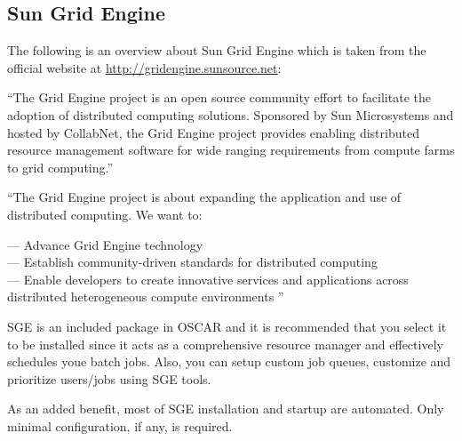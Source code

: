 %
%

\subsection{Sun Grid Engine}
\label{app:sge}

The following is an overview about Sun Grid Engine which is taken from
the official website at \url{http://gridengine.sunsource.net}:

``The Grid Engine project is an open source community effort to facilitate the adoption of distributed computing solutions. Sponsored by Sun Microsystems and hosted by CollabNet, the Grid Engine project provides enabling distributed resource management software for wide ranging requirements from compute farms to grid computing.'' 

``The Grid Engine project is about expanding the application and use of distributed computing. We want to:  

--- Advance Grid Engine technology  \\
--- Establish community-driven standards for distributed computing  \\
--- Enable developers to create innovative services and applications across distributed heterogeneous compute environments ''

SGE is an included package in OSCAR and it is recommended that you select it to be installed since it acts as a comprehensive resource manager and effectively schedules youe batch jobs. Also, you can setup custom job queues, customize and prioritize users/jobs using SGE tools.

As an added benefit, most of SGE installation and startup are automated. Only minimal configuration, if any, is required.
